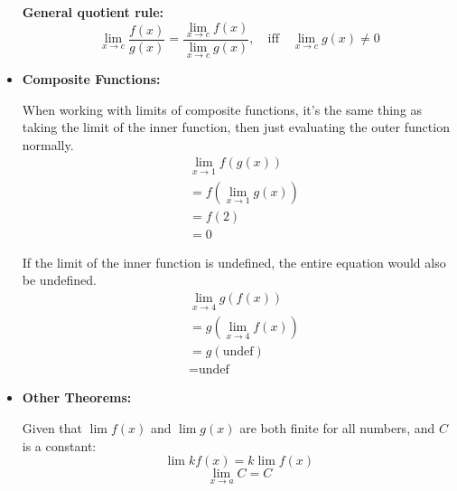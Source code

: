 \documentclass[12pt]{article}
\begin{document}
\begin{itemize}
                    \noindent\textbf{General quotient rule:}
                    \[ \lim_{x \to c} \frac{f(x)}{g(x)} = \frac{\lim_{x \to c} f(x)}{\lim_{x \to c} g(x)}, \quad \textrm{iff} \quad \lim_{x \to c} g(x) \ne 0 \]
                    \smallskip

                \item \textbf{Composite Functions:}

                    When working with limits of composite functions, it's the same thing as taking the limit of the inner function, then just evaluating the outer function normally.
                    \begin{align*}
                        &\lim_{x \to 1} f\left(g(x)\right) \\
                        &= f\left( \lim_{x \to 1} g(x) \right) \\
                        &= f(2) \\
                        &= 0
                    \end{align*}

                    If the limit of the inner function is undefined, the entire equation would also be undefined.
                    \begin{align*}
                        &\lim_{x \to 4} g\left( f(x) \right) \\
                        &= g\left( \lim_{x \to 4} f(x) \right) \\
                        &= g(\text{undef}) \\
                        &= \text{undef}
                    \end{align*}
                    \smallskip

                \item \textbf{Other Theorems:}

                    Given that $\lim f(x)$ and $\lim g(x)$ are both finite for all numbers, and $C$ is a constant:
                    \[ \lim k f(x) = k \lim f(x) \]
                    \[ \lim_{x \to a} C = C \]
                    \smallskip
            \end{itemize}
\end{document}
